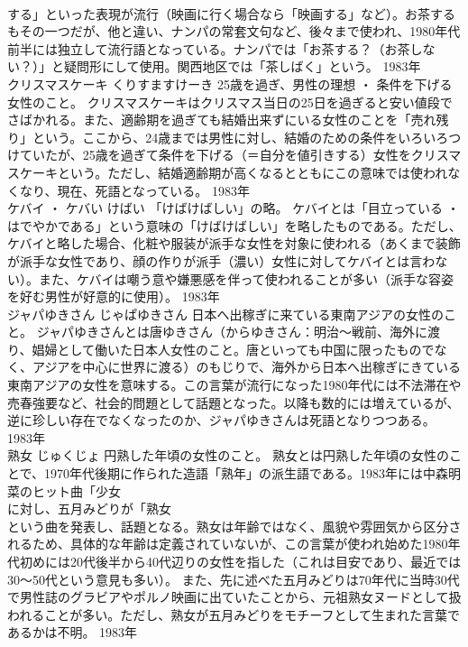 \documentclass[8pt]{extreport}
\begin{document}
\begin{CJK}{UTF8}{min}
\\	する」といった表現が流行（映画に行く場合なら「映画する」など）。お茶するもその一つだが、他と違い、ナンパの常套文句など、後々まで使われ、1980年代前半には独立して流行語となっている。ナンパでは「お茶する？（お茶しない？）」と疑問形にして使用。関西地区では「茶しばく」という。	1983年	
\\	クリスマスケーキ	くりすますけーき	25歳を過ぎ、男性の理想 ・ 条件を下げる女性のこと。	クリスマスケーキはクリスマス当日の25日を過ぎると安い値段でさばかれる。また、適齢期を過ぎても結婚出来ずにいる女性のことを「売れ残り」という。ここから、24歳までは男性に対し、結婚のための条件をいろいろつけていたが、25歳を過ぎて条件を下げる（＝自分を値引きする）女性をクリスマスケーキという。ただし、結婚適齢期が高くなるとともにこの意味では使われなくなり、現在、死語となっている。	1983年	
\\	ケバイ ・ ケバい	けばい	「けばけばしい」の略。	ケバイとは「目立っている ・ はでやかである」という意味の「けばけばしい」を略したものである。ただし、ケバイと略した場合、化粧や服装が派手な女性を対象に使われる（あくまで装飾が派手な女性であり、顔の作りが派手（濃い）女性に対してケバイとは言わない）。また、ケバイは嘲う意や嫌悪感を伴って使われることが多い（派手な容姿を好む男性が好意的に使用）。	1983年	
\\	ジャパゆきさん	じゃぱゆきさん	日本へ出稼ぎに来ている東南アジアの女性のこと。	ジャパゆきさんとは唐ゆきさん（からゆきさん：明治～戦前、海外に渡り、娼婦として働いた日本人女性のこと。唐といっても中国に限ったものでなく、アジアを中心に世界に渡る）のもじりで、海外から日本へ出稼ぎにきている東南アジアの女性を意味する。この言葉が流行になった1980年代には不法滞在や売春強要など、社会的問題として話題となった。以降も数的には増えているが、逆に珍しい存在でなくなったのか、ジャパゆきさんは死語となりつつある。	1983年	
\\	熟女	じゅくじょ	円熟した年頃の女性のこと。	熟女とは円熟した年頃の女性のことで、1970年代後期に作られた造語「熟年」の派生語である。1983年には中森明菜のヒット曲「少女
\\	に対し、五月みどりが「熟女
\\	という曲を発表し、話題となる。熟女は年齢ではなく、風貌や雰囲気から区分されるため、具体的な年齢は定義されていないが、この言葉が使われ始めた1980年代初めには20代後半から40代辺りの女性を指した（これは目安であり、最近では30～50代という意見も多い）。 また、先に述べた五月みどりは70年代に当時30代で男性誌のグラビアやポルノ映画に出ていたことから、元祖熟女ヌードとして扱われることが多い。ただし、熟女が五月みどりをモチーフとして生まれた言葉であるかは不明。	1983年	

\end{CJK}
\end{document}
